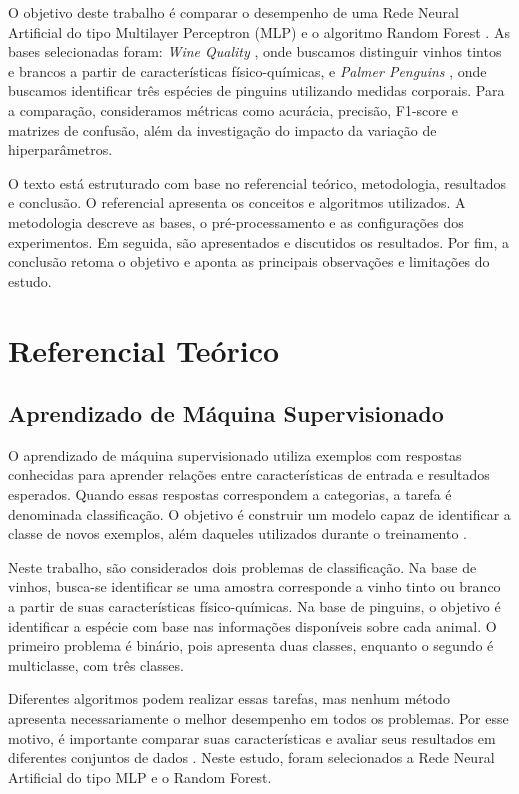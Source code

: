 \documentclass[12pt, oneside, a4paper, english, brazilian]{abntex2}
\begin{document}
O objetivo deste trabalho é comparar o desempenho de uma Rede Neural Artificial do tipo Multilayer Perceptron (MLP) e o algoritmo Random Forest \cite{breiman2001random}. As bases selecionadas foram: \textit{Wine Quality} \cite{cortez2009modeling}, onde buscamos distinguir vinhos tintos e brancos a partir de características físico-químicas, e \textit{Palmer Penguins} \cite{horst2022palmer}, onde buscamos identificar três espécies de pinguins utilizando medidas corporais. Para a comparação, consideramos métricas como acurácia, precisão, F1-score e matrizes de confusão, além da investigação do impacto da variação de hiperparâmetros.

O texto está estruturado com base no referencial teórico, metodologia, resultados e conclusão. O referencial apresenta os conceitos e algoritmos utilizados. A metodologia descreve as bases, o pré-processamento e as configurações dos experimentos. Em seguida, são apresentados e discutidos os resultados. Por fim, a conclusão retoma o objetivo e aponta as principais observações e limitações do estudo.
 
\chapter{Referencial Teórico}

\section{Aprendizado de Máquina Supervisionado}

O aprendizado de máquina supervisionado utiliza exemplos com respostas conhecidas para aprender relações entre características de entrada e resultados esperados. Quando essas respostas correspondem a categorias, a tarefa é denominada classificação. O objetivo é construir um modelo capaz de identificar a classe de novos exemplos, além daqueles utilizados durante o treinamento \cite{faceli2021inteligencia}.

Neste trabalho, são considerados dois problemas de classificação. Na base de vinhos, busca-se identificar se uma amostra corresponde a vinho tinto ou branco a partir de suas características físico-químicas. Na base de pinguins, o objetivo é identificar a espécie com base nas informações disponíveis sobre cada animal. O primeiro problema é binário, pois apresenta duas classes, enquanto o segundo é multiclasse, com três classes.

Diferentes algoritmos podem realizar essas tarefas, mas nenhum método apresenta necessariamente o melhor desempenho em todos os problemas. Por esse motivo, é importante comparar suas características e avaliar seus resultados em diferentes conjuntos de dados \cite{faceli2021inteligencia}. Neste estudo, foram selecionados a Rede Neural Artificial do tipo MLP e o Random Forest.
\end{document}
